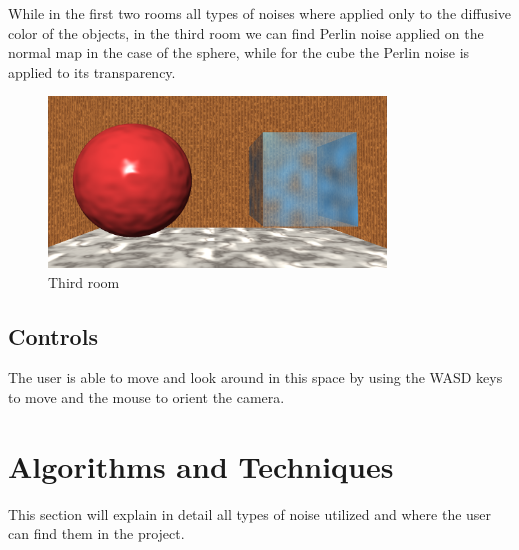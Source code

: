 \documentclass[12pt]{article}
\begin{document}
While in the first two rooms all types of noises where applied only to the diffusive color of the objects, 
in the third room we can find Perlin noise applied on the normal map in the case of the sphere, while for the cube the Perlin noise is applied to its transparency.
\begin{figure}[H]
    \centering
    \includegraphics[width=0.8\textwidth]{Images/thirdRoom.png}
    \caption{Third room}
\end{figure}
\subsection {Controls}
The user is able to move and look around in this space by using the WASD keys to move and the mouse to orient the camera. 

\newpage

\section{Algorithms and Techniques}
\label{sec:algorithms}
This section will explain in detail all types of noise utilized and where the user can find them in the project.
\end{document}
